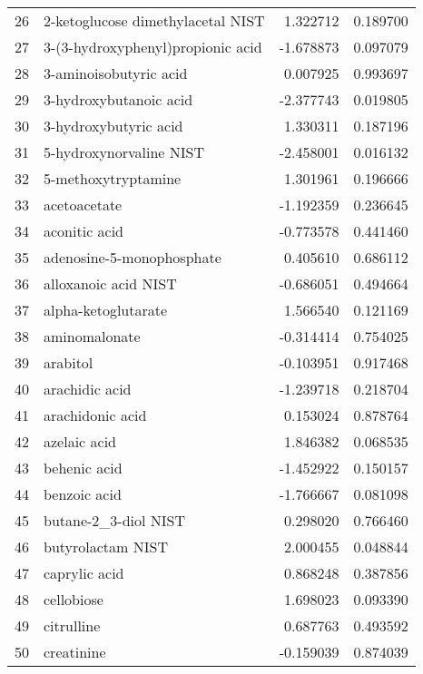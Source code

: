 \begin{tabular}{llrr}
26  &  2-ketoglucose dimethylacetal NIST &  1.322712 &  0.189700 \\
27  &  3-(3-hydroxyphenyl)propionic acid & -1.678873 &  0.097079 \\
28  &             3-aminoisobutyric acid &  0.007925 &  0.993697 \\
29  &             3-hydroxybutanoic acid & -2.377743 &  0.019805 \\
30  &              3-hydroxybutyric acid &  1.330311 &  0.187196 \\
31  &            5-hydroxynorvaline NIST & -2.458001 &  0.016132 \\
32  &                5-methoxytryptamine &  1.301961 &  0.196666 \\
33  &                       acetoacetate & -1.192359 &  0.236645 \\
34  &                      aconitic acid & -0.773578 &  0.441460 \\
35  &          adenosine-5-monophosphate &  0.405610 &  0.686112 \\
36  &               alloxanoic acid NIST & -0.686051 &  0.494664 \\
37  &                alpha-ketoglutarate &  1.566540 &  0.121169 \\
38  &                      aminomalonate & -0.314414 &  0.754025 \\
39  &                           arabitol & -0.103951 &  0.917468 \\
40  &                     arachidic acid & -1.239718 &  0.218704 \\
41  &                   arachidonic acid &  0.153024 &  0.878764 \\
42  &                       azelaic acid &  1.846382 &  0.068535 \\
43  &                       behenic acid & -1.452922 &  0.150157 \\
44  &                       benzoic acid & -1.766667 &  0.081098 \\
45  &               butane-2\_3-diol NIST &  0.298020 &  0.766460 \\
46  &                  butyrolactam NIST &  2.000455 &  0.048844 \\
47  &                      caprylic acid &  0.868248 &  0.387856 \\
48  &                         cellobiose &  1.698023 &  0.093390 \\
49  &                         citrulline &  0.687763 &  0.493592 \\
50  &                         creatinine & -0.159039 &  0.874039 \\

\end{tabular}
